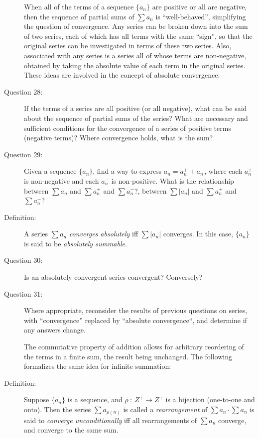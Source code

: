 \documentclass{article}
\begin{document}
\begin{description}
  \item[] When all of the terms of a sequence $\{ a_n \}$ are positive or all are negative, then the sequence of partial sums of $\sum a_n$ is ``well-behaved'', simplifying the question of convergence. Any series can be broken down into the sum of two series, each of which has all terms with the same ``sign'', so that the original series can be investigated in terms of these two series. Also, associated with any series is a series all of whose terms are non-negative, obtained by taking the absolute value of each term in the original series. These ideas are involved in the concept of absolute convergence.

  \item[Question 28:] If the terms of a series are all positive (or all negative), what can be said about the sequence of partial sums of the series? What are necessary and sufficient conditions for the convergence of a series of positive terms (negative terms)? Where convergence holds, what is the sum?

  \item[Question 29:] Given a sequence $\{ a_n \}$, find a way to express $a_n = a_n^+ + a_n^-$, where each $a_n^+$ is non-negative and each $a_n^-$ is non-positive. What is the relationship between $\sum a_n$ and $\sum a_n^+$ and $\sum a_n^-$?, between $\sum |a_n|$ and $\sum a_n^+$ and $\sum a_n^-$?

  \item[Definition:] A series $\sum a_n$ \emph{converges absolutely} iff $\sum |a_n|$ converges. In this case, $\{ a_n \}$ is said to be \emph{absolutely summable}.

  \item[Question 30:] Is an absolutely convergent series convergent? Conversely?

  \item[Question 31:] Where appropriate, reconsider the results of previous questions on series, with ``convergence'' replaced by ``absolute convergence``, and determine if any answers change.

  \item[] The commutative property of addition allows for arbitrary reordering of the terms in a finite sum, the result being unchanged. The following formalizes the same idea for infinite summation:

  \item[Definition:] Suppose $\{ a_n \}$ is a sequence, and $\rho\ :\ Z^+ \to Z^+$ is a bijection (one-to-one and onto). Then the series $\sum a_{\rho(n)}$ is called a \emph{rearrangement} of $\sum a_n \cdot \sum a_n$ is said to \emph{converge unconditionally} iff all rearrangements of $\sum a_n$ converge, and converge to the same sum.


\end{description}
\end{document}
